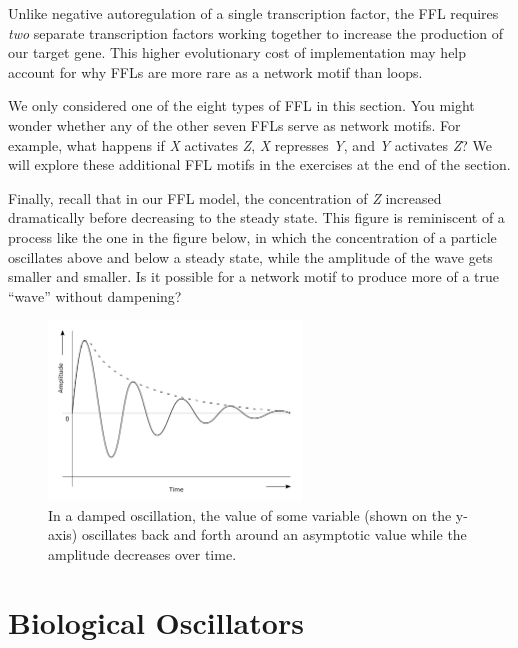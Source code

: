 Unlike negative autoregulation of a single transcription factor, the FFL requires \textit{two} separate transcription factors working together to increase the production of our target gene. This higher evolutionary cost of implementation may help account for why FFLs are more rare as a network motif than loops.

We only considered one of the eight types of FFL in this section. You might wonder whether any of the other seven FFLs serve as network motifs.  For example, what happens if \textit{X} activates \textit{Z}, \textit{X} represses \textit{Y}, and \textit{Y} activates \textit{Z}? We will explore these additional FFL motifs in the exercises at the end of the section.

Finally, recall that in our FFL model, the concentration of \textit{Z} increased dramatically before decreasing to the steady state. This figure is reminiscent of a  process like the one in the figure below, in which the concentration of a particle oscillates above and below a steady state, while the amplitude of the wave gets smaller and smaller. Is it possible for a network motif to produce more of a true ``wave'' without dampening?

\begin{figure}[h]
\centering
\mySfFamily
\includegraphics[width = 0.6\textwidth]{../images/damped_oscillator.png}
\caption{In a damped oscillation, the value of some variable (shown on the y-axis) oscillates back and forth around an asymptotic value while the amplitude decreases over time.}
\label{fig:damped_oscillator}
\end{figure}


\FloatBarrier
{}

\section{Biological Oscillators}
\label{sec:biological_oscillators}

